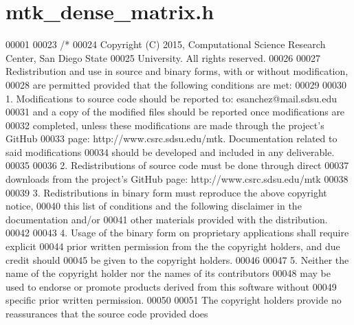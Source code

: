 \hypertarget{mtk__dense__matrix_8h_source}{\section{mtk\+\_\+dense\+\_\+matrix.\+h}
\label{mtk__dense__matrix_8h_source}
}

\begin{DoxyCode}
00001 
00023 \textcolor{comment}{/*}
00024 \textcolor{comment}{Copyright (C) 2015, Computational Science Research Center, San Diego State}
00025 \textcolor{comment}{University. All rights reserved.}
00026 \textcolor{comment}{}
00027 \textcolor{comment}{Redistribution and use in source and binary forms, with or without modification,}
00028 \textcolor{comment}{are permitted provided that the following conditions are met:}
00029 \textcolor{comment}{}
00030 \textcolor{comment}{1. Modifications to source code should be reported to: esanchez@mail.sdsu.edu}
00031 \textcolor{comment}{and a copy of the modified files should be reported once modifications are}
00032 \textcolor{comment}{completed, unless these modifications are made through the project's GitHub}
00033 \textcolor{comment}{page: http://www.csrc.sdsu.edu/mtk. Documentation related to said modifications}
00034 \textcolor{comment}{should be developed and included in any deliverable.}
00035 \textcolor{comment}{}
00036 \textcolor{comment}{2. Redistributions of source code must be done through direct}
00037 \textcolor{comment}{downloads from the project's GitHub page: http://www.csrc.sdsu.edu/mtk}
00038 \textcolor{comment}{}
00039 \textcolor{comment}{3. Redistributions in binary form must reproduce the above copyright notice,}
00040 \textcolor{comment}{this list of conditions and the following disclaimer in the documentation and/or}
00041 \textcolor{comment}{other materials provided with the distribution.}
00042 \textcolor{comment}{}
00043 \textcolor{comment}{4. Usage of the binary form on proprietary applications shall require explicit}
00044 \textcolor{comment}{prior written permission from the the copyright holders, and due credit should}
00045 \textcolor{comment}{be given to the copyright holders.}
00046 \textcolor{comment}{}
00047 \textcolor{comment}{5. Neither the name of the copyright holder nor the names of its contributors}
00048 \textcolor{comment}{may be used to endorse or promote products derived from this software without}
00049 \textcolor{comment}{specific prior written permission.}
00050 \textcolor{comment}{}
00051 \textcolor{comment}{The copyright holders provide no reassurances that the source code provided does}

\end{DoxyCode}
